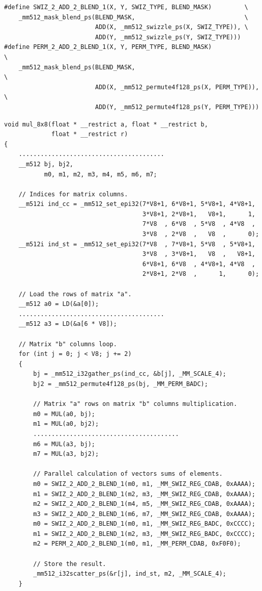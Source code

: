 \documentclass[
11pt,%
tightenlines,%
twoside,%
onecolumn,%
nofloats,%
nobibnotes,%
nofootinbib,%
superscriptaddress,%
noshowpacs,%
centertags]%
{revtex4}
\begin{document}
\begin{lstlisting}
#define SWIZ_2_ADD_2_BLEND_1(X, Y, SWIZ_TYPE, BLEND_MASK)         \
    _mm512_mask_blend_ps(BLEND_MASK,                              \
                         ADD(X, _mm512_swizzle_ps(X, SWIZ_TYPE)), \
                         ADD(Y, _mm512_swizzle_ps(Y, SWIZ_TYPE)))
#define PERM_2_ADD_2_BLEND_1(X, Y, PERM_TYPE, BLEND_MASK)              \
    _mm512_mask_blend_ps(BLEND_MASK,                                   \
                         ADD(X, _mm512_permute4f128_ps(X, PERM_TYPE)), \
                         ADD(Y, _mm512_permute4f128_ps(Y, PERM_TYPE)))

\end{lstlisting}

\begin{lstlisting}
void mul_8x8(float * __restrict a, float * __restrict b,
             float * __restrict r)
{
    ........................................
    __m512 bj, bj2,
           m0, m1, m2, m3, m4, m5, m6, m7;

    // Indices for matrix columns.
    __m512i ind_cc = _mm512_set_epi32(7*V8+1, 6*V8+1, 5*V8+1, 4*V8+1,
                                      3*V8+1, 2*V8+1,   V8+1,      1,
                                      7*V8  , 6*V8  , 5*V8  , 4*V8  ,
                                      3*V8  , 2*V8  ,   V8  ,      0);
    __m512i ind_st = _mm512_set_epi32(7*V8  , 7*V8+1, 5*V8  , 5*V8+1,
                                      3*V8  , 3*V8+1,   V8  ,   V8+1,
                                      6*V8+1, 6*V8  , 4*V8+1, 4*V8  ,
                                      2*V8+1, 2*V8  ,      1,      0);

    // Load the rows of matrix "a".
    __m512 a0 = LD(&a[0]);
    ........................................
    __m512 a3 = LD(&a[6 * V8]);

    // Matrix "b" columns loop.
    for (int j = 0; j < V8; j += 2)
    {
        bj = _mm512_i32gather_ps(ind_cc, &b[j], _MM_SCALE_4);
        bj2 = _mm512_permute4f128_ps(bj, _MM_PERM_BADC);

        // Matrix "a" rows on matrix "b" columns multiplication.
        m0 = MUL(a0, bj);
        m1 = MUL(a0, bj2);
        ........................................
        m6 = MUL(a3, bj);
        m7 = MUL(a3, bj2);

        // Parallel calculation of vectors sums of elements.
        m0 = SWIZ_2_ADD_2_BLEND_1(m0, m1, _MM_SWIZ_REG_CDAB, 0xAAAA);
        m1 = SWIZ_2_ADD_2_BLEND_1(m2, m3, _MM_SWIZ_REG_CDAB, 0xAAAA);
        m2 = SWIZ_2_ADD_2_BLEND_1(m4, m5, _MM_SWIZ_REG_CDAB, 0xAAAA);
        m3 = SWIZ_2_ADD_2_BLEND_1(m6, m7, _MM_SWIZ_REG_CDAB, 0xAAAA);
        m0 = SWIZ_2_ADD_2_BLEND_1(m0, m1, _MM_SWIZ_REG_BADC, 0xCCCC);
        m1 = SWIZ_2_ADD_2_BLEND_1(m2, m3, _MM_SWIZ_REG_BADC, 0xCCCC);
        m2 = PERM_2_ADD_2_BLEND_1(m0, m1, _MM_PERM_CDAB, 0xF0F0);

        // Store the result.
        _mm512_i32scatter_ps(&r[j], ind_st, m2, _MM_SCALE_4);
    }
\end{lstlisting}
\end{document}
